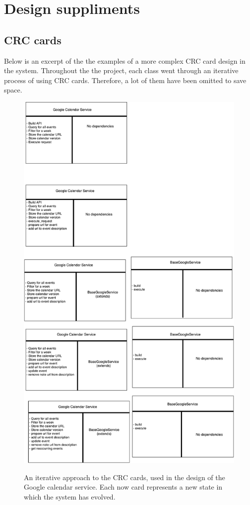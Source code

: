 \chapter{Design suppliments}
\label{appendix:sup_design}

\section{CRC cards}\label{sup:crc}
Below is an excerpt of the the examples of a more complex CRC card design in the system. Throughout the the project, each class went through an iterative process of using CRC cards. Therefore, a lot of them have been omitted to save space.

\begin{figure}[H]
  \centering
  \includegraphics{images/google_calendar_service.pdf}
  \label{fig:crc_card_google_calendar}
  \caption{An iterative approach to the CRC cards, used in the design of the Google calendar service. Each now card represents a new state in which the system has evolved.}
\end{figure}

